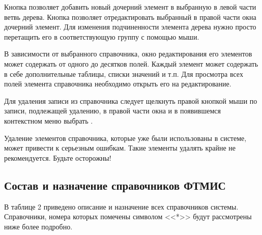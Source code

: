 Кнопка   позволяет добавить новый дочерний элемент в выбранную в левой части ветвь дерева. Кнопка   позволяет отредактировать выбранный в правой части окна дочерний элемент. Для изменения подчиненности элемента дерева нужно просто перетащить его в соответствующую группу с помощью мыши.

В зависимости от выбранного справочника, окно редактирования его элементов может содержать от одного до десятков полей. Каждый элемент может содержать в себе дополнительные таблицы, списки значений и т.п. Для просмотра всех полей элемента справочника необходимо открыть его на редактирование.

Для удаления записи из справочника следует щелкнуть правой кнопкой мыши по записи, подлежащей удалению, в правой части окна и в появившемся контекстном меню выбрать .

\begin{vnim}
 Удаление элементов справочника, которые уже были использованы в системе, может привести к серьезным ошибкам. Такие элементы удалять крайне не рекомендуется. Будьте осторожны!
\end{vnim}

\subsection{Состав и назначение справочников ФТМИС}

В таблице 2 приведено описание и назначение всех справочников системы. Справочники, номера которых помечены символом <<*>> будут рассмотрены ниже более подробно.

